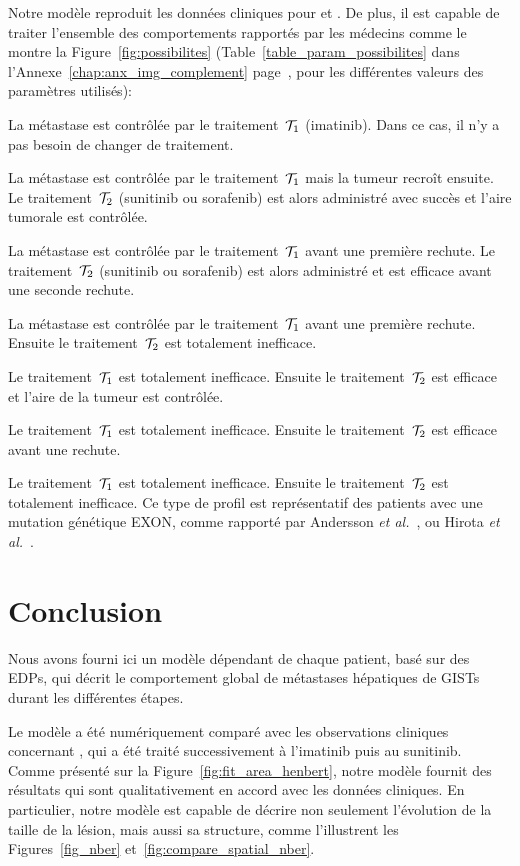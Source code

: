 \documentclass[main.tex]{subfiles}
\begin{document}
Notre modèle reproduit les données cliniques pour \Nber et \Chen. De plus, il est capable de traiter l'ensemble des comportements rapportés par les médecins comme le montre la Figure~\ref{fig:possibilites} 
(\cf Table~\ref{table_param_possibilites} dans l'Annexe~\ref{chap:anx_img_complement} page~\pageref{table_param_possibilites}, pour les différentes valeurs des paramètres utilisés):
\begin{myenumerate}[label={\alph{*})}]
\item La métastase est contrôlée par le traitement~${\mathcal T_1}$ (imatinib). 
Dans ce cas, il n'y a pas besoin de changer de traitement. 
\item La métastase est contrôlée par le traitement~${\mathcal T_1}$ mais la tumeur recroît ensuite. Le traitement~${\mathcal T_2}$ (sunitinib ou sorafenib) est alors administré avec succès et l'aire tumorale est contrôlée. 
\item La métastase est contrôlée par le traitement~${\mathcal T_1}$ avant une première rechute. Le traitement~${\mathcal T_2}$ (sunitinib ou sorafenib) est alors administré et est efficace avant une seconde rechute. 
\item La métastase est contrôlée par le traitement~${\mathcal T_1}$ avant une première rechute. Ensuite le traitement~${\mathcal T_2}$ est totalement inefficace. 
\item Le traitement~${\mathcal T_1}$ est totalement inefficace. 
Ensuite le traitement~${\mathcal T_2}$ est efficace et l'aire de la tumeur est contrôlée. 
\item Le traitement~${\mathcal T_1}$ est totalement inefficace. 
Ensuite le traitement~${\mathcal T_2}$ est efficace avant une rechute.
\item Le traitement~${\mathcal T_1}$ est totalement inefficace. 
Ensuite le  traitement~${\mathcal T_2}$ est totalement inefficace. 
Ce type de profil est représentatif des patients avec une mutation génétique EXON, comme rapporté par Andersson
{\it et al.}~\cite{Andersson2006}, ou Hirota {\it et al.}~\cite{Hirota1998}.
\end{myenumerate}

\FloatBarrier
\section{Conclusion}

Nous avons fourni ici un modèle dépendant de chaque patient, basé sur des EDPs, qui décrit le comportement global de métastases hépatiques de GISTs durant les différentes étapes. 


Le modèle a été numériquement comparé avec les observations cliniques concernant \Nber, qui a été traité successivement à l'imatinib puis au sunitinib.
Comme présenté sur la 
Figure~\ref{fig:fit_area_henbert}, notre modèle fournit des résultats qui sont qualitativement en accord avec les données cliniques. En particulier, notre modèle est capable de décrire non seulement l'évolution de la taille de la lésion, mais aussi sa structure, comme l'illustrent les Figures~\ref{fig_nber} et~\ref{fig:compare_spatial_nber}.
\end{document}
